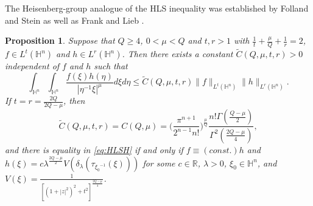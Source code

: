 \documentclass[10pt,a4paper]{amsart}
\newtheorem{proposition}{Proposition}[section]
\begin{document}
{The Heisenberg-group analogue of the HLS inequality was established} by Folland and Stein \cite{FS74} as well as Frank and Lieb \cite{FL12}.
\begin{proposition}\label{pro:HLS}
 Suppose that $Q\geq 4$, $0<\mu< Q$ and $t,r>1$ with $\frac{1}{t}+\frac{\mu}{Q}+\frac{1}{r}=2$, $f\in L^{t}(\mathbb{H}^{n})$ and $h\in L^{r}(\mathbb{H}^{n})$. Then there exists a constant $\widetilde{C}(Q,\mu,t,r)>0$ independent of $f$ and $h$ such that
 \begin{equation}\label{eq:HLSH} \int_{\mathbb{H}^{n}}\int_{\mathbb{H}^{n}}\frac{f(\xi)h(\eta)}{|\eta^{-1}\xi|^{\mu}}
d\xi{d}\eta\leq \widetilde{C}(Q,\mu,t,r)\|f\|_{L^t(\mathbb{H}^{n})}\|h\|_{L^r(\mathbb{H}^{n})}.
 \end{equation}
 If $t=r=\frac{2Q}{2Q-\mu}$, then
\begin{equation*}
 \widetilde{C}(Q,\mu,t,r)=C(Q,\mu)=\bigg(\frac{\pi^{n+1}}{2^{n-1}n!}\bigg)^{\frac{\mu}{Q}}
 \frac{n!\Gamma(\frac{Q-\mu}{2})}{\Gamma^2(\frac{2Q-\mu}{4})},
\end{equation*}
and there is equality in \eqref{eq:HLSH} if and only if $f\equiv (const.)h$ and $h(\xi)=c\lambda^{\frac{2Q-\mu}{2}}V(\delta_\lambda(\tau_{{\xi_0}^{-1}}(\xi)))$ for some $c\in \mathbb{R}$, $\lambda>0$, $\xi_{0}\in\mathbb{H}^{n}$, and $V(\xi)=\frac{1}{[(1+|z|^{2})^{2}+t^{2}]^{\frac{2Q-\mu}{4}}}$.
\end{proposition}
\end{document}
